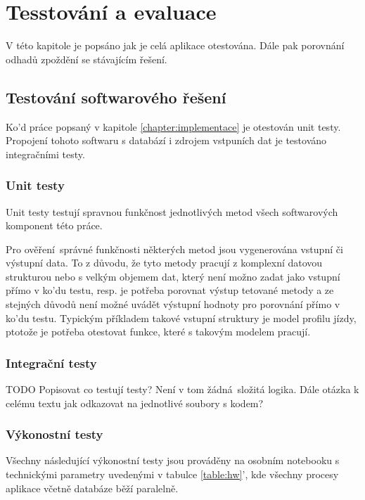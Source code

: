 
\chapter{Tesstování a evaluace}

V této kapitole je popsáno jak je celá aplikace otestována. Dále pak porovnání odhadů zpoždění se stávajícím řešení.

\section{Testování softwarového řešení}

Ko'd práce popsaný v kapitole \ref{chapter:implementace} je otestován unit testy. Propojení  tohoto softwaru s databází i zdrojem vstpuních dat je testováno integračními testy.

\subsection{Unit testy}

Unit testy testují spravnou funkčnost jednotlivých metod všech softwarových komponent této práce.

Pro ověření správné funkčnosti některých metod jsou vygenerována vstupní či výstupní data. To z důvodu, že tyto metody pracují z komplexní datovou strukturou nebo s velkým objemem dat, který není možno zadat jako vstupní přímo v ko'du testu, resp. je potřeba porovnat výstup tetované metody a ze stejných důvodů není možné uvádět výstupní hodnoty pro porovnání přímo v ko'du testu. Typickým příkladem takové vstupní struktury je model profilu jízdy, ptotože je potřeba otestovat funkce, které s takovým modelem pracují.

\subsection{Integrační testy}

TODO Popisovat co testují testy? Není v tom žádná složitá logika. Dále otázka k celému textu jak odkazovat na jednotlivé soubory s kodem?

\subsection{Výkonostní testy}

Všechny následující výkonostní testy jsou prováděny na osobním notebooku s technickými parametry uvedenými v tabulce \ref{table:hw}', kde všechny procesy aplikace včetně databáze běží paralelně.

